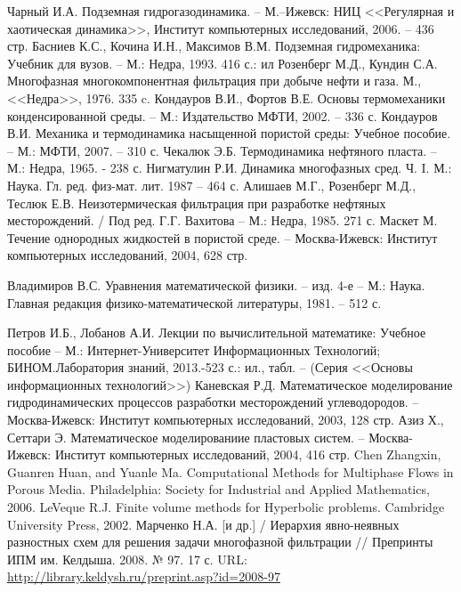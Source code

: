 \begin{thebibliography}{99}

 Чарный И.А. Подземная гидрогазодинамика. -- М.--Ижевск: НИЦ <<Регулярная и хаотическая динамика>>, Институт компьютерных исследований, 2006. -- 436 стр.
 Басниев К.С., Кочина И.Н., Максимов В.М. Подземная гидромеханика: Учебник для вузов. -- М.: Недра, 1993. 416 с.: ил
 Розенберг М.Д., Кундин С.А. Многофазная многокомпонентная фильтрация при добыче нефти и газа. М., <<Недра>>, 1976. 335 c.
 Кондауров В.И., Фортов В.Е. Основы термомеханики конденсированной среды. -- М.: Издательство МФТИ, 2002. -- 336 с.
 Кондауров В.И. Механика и термодинамика насыщенной пористой среды: Учебное пособие. -- М.: МФТИ, 2007. -- 310 с.
 Чекалюк Э.Б. Термодинамика нефтяного пласта. -- М.: Недра, 1965. - 238 с.
 Нигматулин Р.И. Динамика многофазных сред. Ч. I. М.: Наука. Гл. ред. физ-мат. лит. 1987 -- 464 с.
 Алишаев М.Г., Розенберг М.Д., Теслюк Е.В. Неизотермическая фильтрация при разработке нефтяных месторождений. / Под ред. Г.Г. Вахитова -- М.: Недра, 1985. 271 с.
 Маскет М. Течение однородных жидкостей в пористой среде. -- Москва-Ижевск: Институт компьютерных исследований, 2004, 628 стр.

 Владимиров В.С. Уравнения математической физики. -- изд. 4-е -- М.: Наука. Главная редакция физико-математической литературы, 1981. -- 512 с.

 Петров И.Б., Лобанов А.И. Лекции по вычислительной математике: Учебное пособие -- М.: Интернет-Университет Информационных Технологий; БИНОМ.Лаборатория знаний, 2013.-523 с.: ил., табл. -- (Серия <<Основы информационных технологий>>)
 Каневская Р.Д. Математическое моделирование гидродинамических процессов разработки месторождений углеводородов. -- Москва-Ижевск: Институт компьютерных исследований, 2003, 128 стр.
 Азиз Х., Сеттари Э. Математическое моделированиие пластовых систем. -- Москва-Ижевск: Институт компьютерных исследований, 2004, 416 стр.
 Chen Zhangxin, Guanren Huan, and Yuanle Ma. Computational Methods for Multiphase Flows in Porous Media. Philadelphia: Society for Industrial and Applied Mathematics, 2006.
 LeVeque R.J. Finite volume methods for Hyperbolic problems. Cambridge University Press, 2002.
 Марченко Н.А. [и др.] / Иерархия явно-неявных разностных схем для решения задачи многофазной фильтрации // Препринты ИПМ им. Келдыша. 2008. № 97. 17 с. URL: \url{http://library.keldysh.ru/preprint.asp?id=2008-97}


\end{thebibliography}
